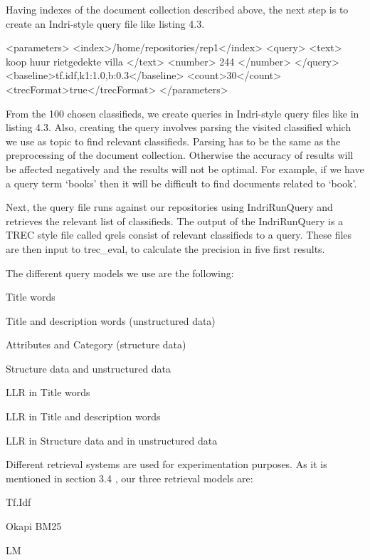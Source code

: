 Having indexes of the document collection described above, the next step is to create an Indri-style query file like listing 4.3.

\begin{code}[caption={Query parameter file}]
<parameters>
 <index>/home/repositories/rep1</index>
  <query>
 	<text> koop huur rietgedekte villa </text>
	<number> 244 </number>
  </query>
  <baseline>tf.idf,k1:1.0,b:0.3</baseline>
  <count>30</count>
  <trecFormat>true</trecFormat>
</parameters>
\end{code}

From the 100 chosen classifieds, we create queries in Indri-style query files like in listing 4.3. Also, creating the query involves parsing the visited classified which we use as topic to find relevant classifieds. Parsing has to be the same as the preprocessing of the document collection. Otherwise the accuracy of results will be affected negatively and the results will not be optimal. For example, if we have a query term `books' then it will be difficult to find documents related to `book'.

Next, the query file runs against our repositories using IndriRunQuery and retrieves the relevant list of classifieds. The output of the IndriRunQuery is a TREC style file called qrels consist of relevant classifieds to a query. These files are then input to trec\_eval, to calculate the precision in five first results.


The different query models we use are the following:

\begin{list}{.}{}
\item{Title words}
\item{Title and description words (unstructured data)}
\item{Attributes and Category (structure data)}
\item{Structure data and unstructured data}
\item{LLR in Title words}
\item{LLR in Title and description words}
\item{LLR in Structure data and in unstructured data}
\end{list}


Different retrieval systems are used for experimentation purposes. As it is mentioned in section 3.4 , our three retrieval models are:
\begin{list}{.}{}
\item{Tf.Idf}
\item{Okapi BM25}
\item{LM}
\end{list}

